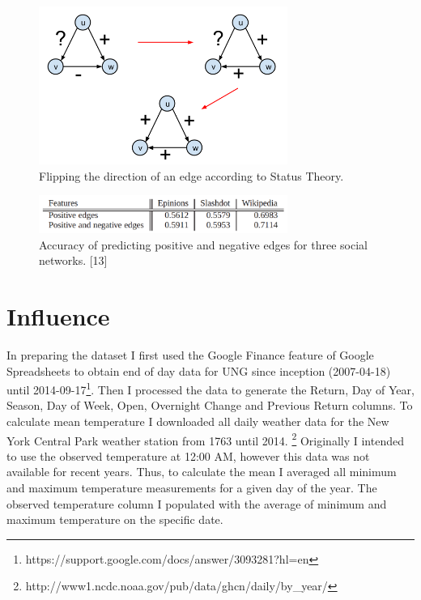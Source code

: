 \documentclass[conference,letterpaper]{IEEEtran}
\begin{document}
\begin{center}
\begin{figure}[hb]
\centering
\includegraphics[width=3.2in]{status_theory}
\caption{
Flipping the direction of an edge according to Status Theory.
}
\label{fig_sim}
\end{figure}
\end{center}

\begin{center}
\begin{figure}[hb]
\centering
\includegraphics[width=3.2in]{predicting_positive}
\caption{
Accuracy of predicting positive and negative edges for three social networks. [13]
}
\label{fig_sim}
\end{figure}
\end{center}


\section{Influence}
In preparing the dataset I first used the Google Finance feature of Google Spreadsheets to obtain end of day data for UNG
since inception (2007-04-18) until 2014-09-17\footnote{https://support.google.com/docs/answer/3093281?hl=en}. Then I processed 
the data to generate the Return, Day of Year, Season, Day of Week, Open, Overnight Change and Previous Return columns.
To calculate mean temperature I downloaded all daily weather data for the New York Central Park weather station from 1763 until 2014.
\footnote{http://www1.ncdc.noaa.gov/pub/data/ghcn/daily/by\_year/}
Originally I intended to use the observed temperature at 12:00 AM, however this data was not available for recent years.
Thus, to calculate the mean I averaged all minimum and maximum temperature measurements for a given day of the year. 
The observed temperature column I populated with the average of minimum and maximum temperature on the specific date. \\
\end{document}
